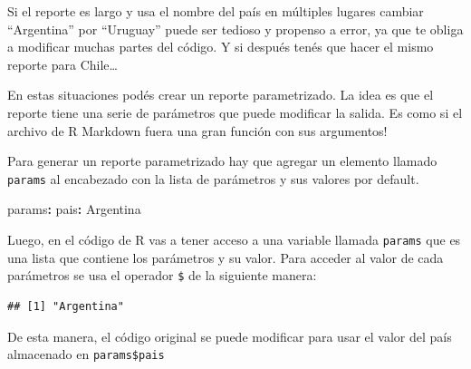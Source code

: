 \documentclass[
  openany]{book}
\newenvironment{Shaded}{\begin{snugshade}}{\end{snugshade}}
\newcommand{\AttributeTok}[1]{\textcolor[rgb]{0.77,0.63,0.00}{#1}}
\newcommand{\FunctionTok}[1]{\textcolor[rgb]{0.00,0.00,0.00}{#1}}
\newcommand{\KeywordTok}[1]{\textcolor[rgb]{0.13,0.29,0.53}{\textbf{#1}}}
\newcommand{\NormalTok}[1]{#1}
\newcommand{\OtherTok}[1]{\textcolor[rgb]{0.56,0.35,0.01}{#1}}
\newcommand{\SpecialCharTok}[1]{\textcolor[rgb]{0.00,0.00,0.00}{#1}}
\newcommand{\StringTok}[1]{\textcolor[rgb]{0.31,0.60,0.02}{#1}}
\begin{document}
Si el reporte es largo y usa el nombre del país en múltiples lugares cambiar ``Argentina'' por ``Uruguay'' puede ser tedioso y propenso a error, ya que te obliga a modificar muchas partes del código. Y si después tenés que hacer el mismo reporte para Chile\ldots{}

En estas situaciones podés crear un reporte parametrizado. La idea es que el reporte tiene una serie de parámetros que puede modificar la salida. Es como si el archivo de R Markdown fuera una gran función con sus argumentos!

Para generar un reporte parametrizado hay que agregar un elemento llamado \texttt{params} al encabezado con la lista de parámetros y sus valores por default.

\begin{Shaded}
\begin{Highlighting}[]
\FunctionTok{params}\KeywordTok{:}
\AttributeTok{  }\FunctionTok{pais}\KeywordTok{:}\AttributeTok{ Argentina}
\end{Highlighting}
\end{Shaded}

Luego, en el código de R vas a tener acceso a una variable llamada \texttt{params} que es una lista que contiene los parámetros y su valor. Para acceder al valor de cada parámetros se usa el operador \texttt{\$} de la siguiente manera:

\begin{Shaded}
\end{Shaded}

\begin{verbatim}
## [1] "Argentina"
\end{verbatim}

De esta manera, el código original se puede modificar para usar el valor del país almacenado en \texttt{params\$pais}

\begin{Shaded}
\end{Shaded}
\end{document}
